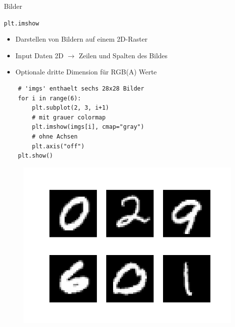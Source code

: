 \documentclass[utf8, smaller, c]{beamer}
\renewcommand{\tt}[1]{{\texttt{#1}}}
\begin{document}
\begin{frame}[fragile]{Bilder}
    \vspace*{1mm}
	\begin{block}{\tt{plt.imshow}}
		\begin{itemize}
			\item Darstellen von Bildern auf einem 2D-Raster
			\item Input Daten 2D $\rightarrow$ Zeilen und Spalten des Bildes
			\item Optionale dritte Dimension für RGB(A) Werte
		\end{itemize}
	\end{block}
	\vspace{-2mm}
	\begin{minipage}{0.48\textwidth}
		\begin{lstlisting}
	# 'imgs' enthaelt sechs 28x28 Bilder
	for i in range(6):
    	plt.subplot(2, 3, i+1)
    	# mit grauer colormap
    	plt.imshow(imgs[i], cmap="gray")
    	# ohne Achsen
    	plt.axis("off")
	plt.show()
		\end{lstlisting}
	\end{minipage}
	\begin{minipage}{0.51\textwidth}
		\begin{figure}
			\includegraphics[width=\textwidth]{pics/imshow}
		\end{figure}
	\end{minipage}	
\end{frame}
\end{document}
